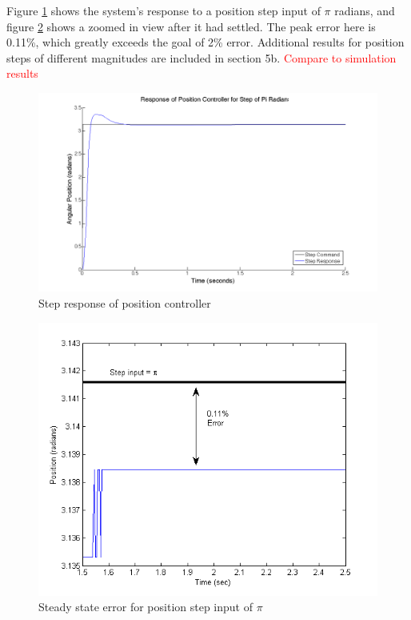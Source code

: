 \documentclass{article}
\newcommand{\xxx}[1]{\textcolor{red}{#1}}
\theoremstyle{plain}
\theoremstyle{definition}
\theoremstyle{remark}
\begin{document}
Figure \ref{PosStepPi} shows the system's response to a position step input of $\pi$ radians, and figure \ref{PosStepError} shows a zoomed in view after it had settled. The peak error here is 0.11\%, which greatly exceeds the goal of 2\% error. Additional results for position steps of different magnitudes are included in section 5b.
\xxx{Compare to simulation results}

\begin{figure}[htb]
\begin{center}
\includegraphics[width = 14cm]{posstep_1pi.png}
\caption{Step response of position controller}
\label{PosStepPi}
\end{center}
\end{figure}

\begin{figure}[htb]
\begin{center}
\includegraphics[width = 12cm]{positionStepError.png}
\caption{Steady state error for position step input of $\pi$}
\label{PosStepError}
\end{center}
\end{figure}
\end{document}
